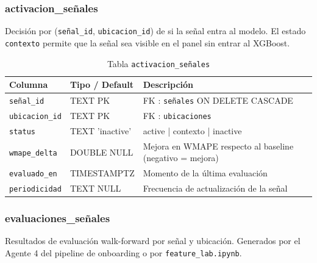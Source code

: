 \documentclass[12pt, a4paper]{article}
\begin{document}
\subsubsection{activacion\_señales}

Decisión por (\texttt{señal\_id}, \texttt{ubicacion\_id}) de si la señal entra al modelo. El estado \texttt{contexto} permite que la señal sea visible en el panel sin entrar al XGBoost.

\begin{table}[H]
\centering
\renewcommand{\arraystretch}{1.2}
\begin{tabular}{llp{5.5cm}}
\toprule
\textbf{Columna} & \textbf{Tipo / Default} & \textbf{Descripción} \\
\midrule
\texttt{señal\_id}     & TEXT PK            & FK : \texttt{señales} ON DELETE CASCADE \\
\texttt{ubicacion\_id} & TEXT PK            & FK : \texttt{ubicaciones} \\
\texttt{status}        & TEXT 'inactive'    & active | contexto | inactive \\
\texttt{wmape\_delta}  & DOUBLE NULL        & Mejora en WMAPE respecto al baseline (negativo = mejora) \\
\texttt{evaluado\_en}  & TIMESTAMPTZ        & Momento de la última evaluación \\
\texttt{periodicidad}  & TEXT NULL          & Frecuencia de actualización de la señal \\
\bottomrule
\end{tabular}
\caption{Tabla \texttt{activacion\_señales}}
\end{table}

\subsubsection{evaluaciones\_señales}

Resultados de evaluación walk-forward por señal y ubicación. Generados por el Agente 4 del pipeline de onboarding o por \texttt{feature\_lab.ipynb}.
\end{document}
